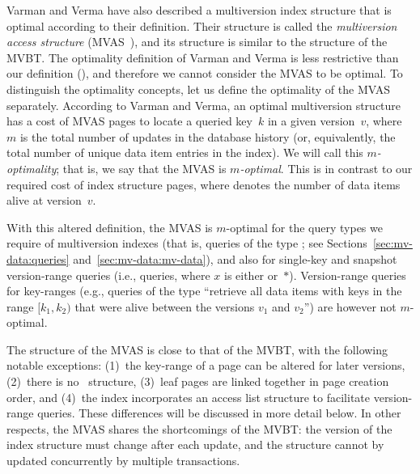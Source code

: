 Varman and Verma have also described a multiversion index structure that is
optimal according to their definition.
Their structure is called the \emph{multiversion access structure}
(MVAS~\cite{varman:1997:multiversion}\label{def:mvas}), and its structure
is similar to the structure of the MVBT\@.
The optimality definition of Varman and Verma is less restrictive than our
definition (), and therefore we cannot consider the MVAS
to be optimal.
To distinguish the optimality concepts, let us define the optimality of the
MVAS separately.
According to Varman and Verma, an optimal multiversion
structure has a cost of  MVAS pages to locate a queried
key~$k$ in a given version~$v$, where $m$ is the total number of updates in the
database history (or, equivalently, the total number of unique data item
entries in the index).
We will call this \emph{$m$-optimality}; that is, we say that the MVAS is
\emph{$m$-optimal}.
This is in contrast to our required cost of 
index structure pages, where  denotes the number of data items alive
at version~$v$.

With this altered definition, the MVAS is $m$-optimal for the query types we
require of multiversion indexes (that is, queries of the
type ; see Sections~\ref{sec:mv-data:queries}
and~\ref{sec:mv-data:mv-data}), and also for single-key and snapshot
version-range queries (i.e.,  queries, where $x$ is either
 or~$*$).
Version-range queries for key-ranges (e.g., queries of the type ``retrieve
all data items with keys in the range $[k_1, k_2)$ that were alive between
the versions $v_1$ and $v_2$'') are however not $m$-optimal.

The structure of the MVAS is close to that of the MVBT, with the
following notable exceptions: 
(1)~the key-range of a page can be altered for later versions, 
(2)~there is no \rootstar\ structure, 
(3)~leaf pages are linked together in page creation order, and
(4)~the index incorporates an access list structure to facilitate
version-range queries. 
These differences will be discussed in more detail below.
In other respects, the MVAS shares the shortcomings of the MVBT: the
version of the index structure must change after each update, and the
structure cannot by updated concurrently by multiple transactions.


